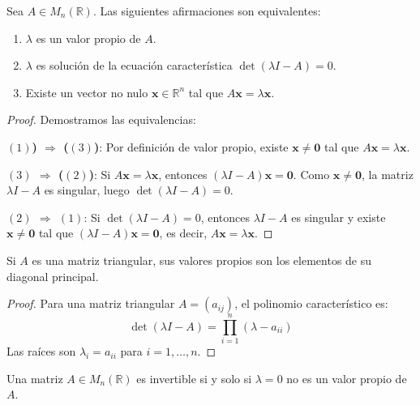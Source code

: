 \begin{theorem}\label{teo:caracterizacion}
Sea $A \in M_n(\mathbb{R})$. Las siguientes afirmaciones son equivalentes:
\begin{enumerate}[$(1)$]
    \item $\lambda$ es un valor propio de $A$.
    \item $\lambda$ es solución de la ecuación característica $\det(\lambda I - A) = 0$.
    \item Existe un vector no nulo $\mathbf{x} \in \mathbb{R}^n$ tal que $A\mathbf{x} = \lambda \mathbf{x}$.
\end{enumerate}
\end{theorem}

\begin{proof}
Demostramos las equivalencias:

\textbf{$(1)$) $\Rightarrow$ ($(3)$)}: Por definición de valor propio, existe $\mathbf{x} \neq \mathbf{0}$ tal que $A\mathbf{x} = \lambda\mathbf{x}$.

\textbf{$(3)$ $\Rightarrow$ ($(2)$)}: Si $A\mathbf{x} = \lambda\mathbf{x}$, entonces $(\lambda I - A)\mathbf{x} = \mathbf{0}$. Como $\mathbf{x} \neq \mathbf{0}$, la matriz $\lambda I - A$ es singular, luego $\det(\lambda I - A) = 0$.

\textbf{$(2)$ $\Rightarrow$ $(1)$}: Si $\det(\lambda I - A) = 0$, entonces $\lambda I - A$ es singular y existe $\mathbf{x} \neq \mathbf{0}$ tal que $(\lambda I - A)\mathbf{x} = \mathbf{0}$, es decir, $A\mathbf{x} = \lambda\mathbf{x}$.
\end{proof}

\begin{coro}\label{cor:triangular}
Si $A$ es una matriz triangular, sus valores propios son los elementos de su diagonal principal.
\end{coro}

\begin{proof}
Para una matriz triangular $A = (a_{ij})$, el polinomio característico es:
\[
\det(\lambda I - A) = \prod_{i=1}^n (\lambda - a_{ii})
\]
Las raíces son $\lambda_i = a_{ii}$ para $i=1,\dots,n$.
\end{proof}

\begin{coro}\label{cor:cerovp}
Una matriz $A\in M_n(\mathbb{R})$ es invertible si y solo si $\lambda=0$ no es un valor propio de $A$.
\end{coro}

